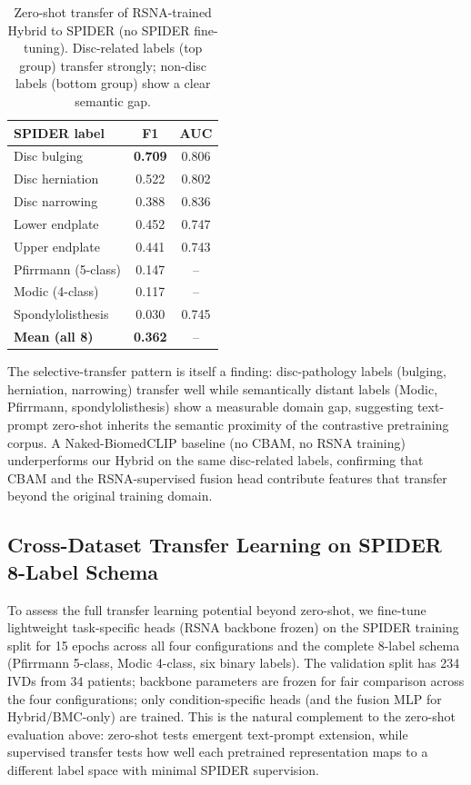 \documentclass[runningheads]{llncs}
\newcommand{\best}[1]{\textcolor{best}{\textbf{#1}}}
\begin{document}
\begin{table}[t]
\centering
\caption{Zero-shot transfer of RSNA-trained Hybrid to SPIDER (no SPIDER
fine-tuning). Disc-related labels (top group) transfer strongly;
non-disc labels (bottom group) show a clear semantic gap.}
\label{tab:spider}
\renewcommand{\arraystretch}{1.05}
\begin{tabular}{@{}lcc@{}}
\toprule
SPIDER label              & F1     & AUC \\
\midrule
Disc bulging              & \best{0.709} & 0.806 \\
Disc herniation           & 0.522 & 0.802 \\
Disc narrowing            & 0.388 & 0.836 \\
\midrule
Lower endplate            & 0.452 & 0.747 \\
Upper endplate            & 0.441 & 0.743 \\
Pfirrmann (5-class)       & 0.147 & --     \\
Modic (4-class)           & 0.117 & --     \\
Spondylolisthesis         & 0.030 & 0.745 \\
\midrule
\textbf{Mean (all 8)}     & \best{0.362} & --     \\
\bottomrule
\end{tabular}
\end{table}

The selective-transfer pattern is itself a finding: disc-pathology
labels (bulging, herniation, narrowing) transfer well while
semantically distant labels (Modic, Pfirrmann, spondylolisthesis)
show a measurable domain gap, suggesting text-prompt zero-shot
inherits the semantic proximity of the contrastive pretraining
corpus. A Naked-BiomedCLIP baseline (no CBAM, no RSNA training)
underperforms our Hybrid on the same disc-related labels,
confirming that CBAM and the RSNA-supervised fusion head contribute
features that transfer beyond the original training domain.

\subsection{Cross-Dataset Transfer Learning on SPIDER 8-Label Schema}
\label{sec:spider_transfer}

To assess the full transfer learning potential beyond zero-shot, we
fine-tune lightweight task-specific heads (RSNA backbone frozen) on
the SPIDER training split for 15 epochs across all four configurations
and the complete 8-label schema (Pfirrmann 5-class, Modic 4-class, six
binary labels). The validation split has 234 IVDs from 34 patients;
backbone parameters are frozen for fair comparison across the four
configurations; only condition-specific heads (and the fusion MLP for
Hybrid/BMC-only) are trained. This is the natural complement to the
zero-shot evaluation above: zero-shot tests emergent text-prompt
extension, while supervised transfer tests how well each pretrained
representation maps to a different label space with minimal SPIDER
supervision.
\end{document}
